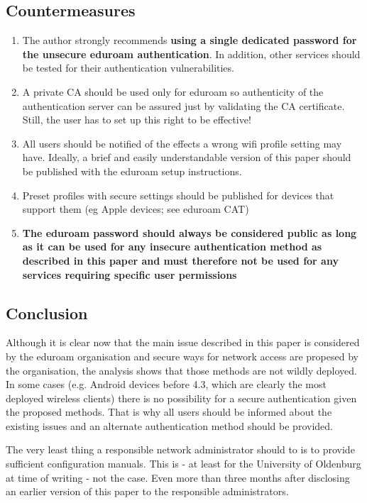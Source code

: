 \documentclass[12pt,a4paper]{scrartcl}
\begin{document}
\subsection{Countermeasures}
\begin{enumerate}
  \item The author strongly recommends \textbf{using a single dedicated password for the unsecure eduroam authentication}. In addition, other services should be tested for their authentication vulnerabilities.
  \item A private CA should be used only for eduroam so authenticity of the authentication server can be assured just by validating the CA certificate. Still, the user has to set up this right to be effective!
  \item All users should be notified of the effects a wrong wifi profile setting may have. Ideally, a brief and easily understandable version of this paper should be published with the eduroam setup instructions.
  \item Preset profiles with secure settings should be published for devices that support them (eg Apple devices; see eduroam CAT)
  \item \textbf{The eduroam password should always be considered public as long as it can be used for any insecure authentication method as described in this paper and must therefore not be used for any services requiring specific user permissions}
\end{enumerate}

\subsection{Conclusion}
Although it is clear now that the main issue described in this paper is considered by the eduroam organisation and secure ways for network access are propesed by the organisation, the analysis shows that those methods are not wildly deployed.
In some cases (e.g. Android devices before 4.3, which are clearly the most deployed wireless clients) there is no possibility for a secure authentication given the proposed methods.
That is why all users should be informed about the existing issues and an alternate authentication method should be provided.

The very least thing a responsible network administrator should to is to provide sufficient configuration manuals.
This is - at least for the University of Oldenburg at time of writing - not the case.
Even more than three months after disclosing an earlier version of this paper to the responsible administrators.
\end{document}
